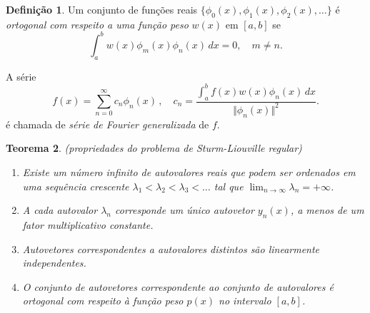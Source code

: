 \documentclass[12pt]{article}
\theoremstyle{plain}
\newtheorem{thm}{Teorema}[section]
\theoremstyle{definition}
\newtheorem{defn}[thm]{Definição}
\theoremstyle{remark}
\begin{document}
\begin{defn}
    Um conjunto de funções reais \(\{\phi_0(x), \phi_1(x), \phi_2(x), \ldots\}\) é \emph{ortogonal com respeito a uma função peso} \(w(x)\) em \([a,b]\) se
    \begin{equation}
        \int_{a}^{b} w(x)\phi_m(x)\phi_n(x) \, dx = 0, \quad m \neq n.
    \end{equation}

    \noindent A série 
    \begin{equation}
    f(x)=\sum_{n=0}^{\infty} c_n \phi_n(x)\,, \quad c_n=\frac{\int_{a}^{b} f(x)w(x)\phi_n(x) \, dx}{\Vert \phi_n(x)\Vert^2}.
    \end{equation}
    \noindent é chamada de \emph{série de Fourier generalizada} de \(f\).
\end{defn}

\begin{thm} (propriedades do problema de Sturm-Liouville regular)
    \begin{enumerate}
        \item[(a)] Existe um número infinito de autovalores reais que podem ser ordenados em uma sequência crescente \( \lambda_1 < \lambda_2 < \lambda_3 < \ldots \) tal que \( \lim_{n \to \infty} \lambda_n = +\infty \).
        \item[(b)] A cada autovalor \( \lambda_n \) corresponde um único autovetor \( y_n(x) \), a menos de um fator multiplicativo constante.
        \item[(c)] Autovetores correspondentes a autovalores distintos são linearmente independentes.
        \item[(d)] O conjunto de autovetores correspondente ao conjunto de autovalores é ortogonal com respeito à função peso \( p(x) \) no intervalo \([a,b]\).
    \end{enumerate}
\end{thm}
\end{document}
